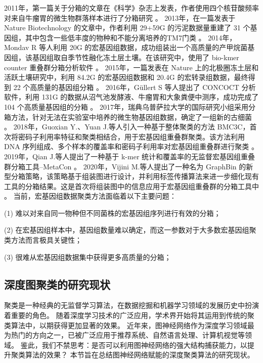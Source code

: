 2011年，第一篇关于分箱的文章在《科学》杂志上发表，作者使用四个核苷酸频率对来自牛瘤胃的微生物群落样本进行了分箱研究 \cite{hess2011metagenomic}。
2013年，在一篇发表于 Nature Biotechnology 的文章中，作者利用 29+59G 的污泥数据量重建了 31 个基因组，其中包含一些低丰度的物种和不能分离培养的TM7门类 \cite{albertsen2013genome}。
2014年，Mondav R 等人利用 20G 的宏基因组数据，成功组装出一个高质量的产甲烷菌基因组，该基因组取自季节性融化冻土层土壤。在该研究中，使用了 bio-kmer counter 重叠群分箱分析软件 \cite{mondav2014discovery}。
2015年，一篇发表在 Nature 上的北极圈冻土层和活跃土壤研究中，利用 84.2G 的宏基因组数据和 20.4G 的宏转录组数据，最终得到 22 个高质量的基因组分箱 \cite{hultman2015multi}。
2016年，Güllert S 等人提出了 CONCOCT 分析软件，利用 131G 的数据从沼气池发酵液、牛瘤胃和大象粪便中测序，成功完成了 104 个高质量基因组的分箱 \cite{gullert2016deep}。
2017年，瑞典乌普萨拉大学的国际研究小组采用分箱方法，针对无法在实验室中培养的微生物基因组数据，确定了一组新的古细菌 \cite{zaremba2017asgard}。
2018年，Guoxian Y.、Yuan J.等人引入一种基于整体聚类的方法 BMC3C，首次将密码子利用率特征和聚类相结合，用于宏基因组重叠群聚类。该方法利用 DNA 序列组成、多个样本的覆盖率和密码子利用率对宏基因组重叠群进行聚类 \cite{yu2018bmc3c}。
2019年，Qian J.等人提出了一种基于 k-mer 统计和覆盖率的无监督宏基因组重叠群分箱工具--MetaCon \cite{qian2019metacon}。
2020年，Vijini M.等人提出了一种名为 GraphBin 的新型分箱策略，该策略基于组装图进行设计，并利用标签传播算法来进一步细化现有工具的分箱结果。这是首次将组装图中的信息应用于宏基因组重叠群的分箱工具中 \cite{mallawaarachchi2020graphbin}。
当前，宏基因组数据聚类方法面临着以下主要问题：

(1) 难以对来自同一物种但不同菌株的宏基因组序列进行有效的分箱；

(2) 在宏基因组样本中，基因组数量难以确定，而这一参数对于大多数宏基因组聚类方法而言极具关键性；

(3) 很难从宏基因组数据集中获得更多高质量的分箱；

\subsection{深度图聚类的研究现状}
聚类是一种经典的无监督学习算法，在数据挖掘和机器学习领域的发展历史中扮演着重要的角色。
随着深度学习技术的广泛应用，学术界开始将其运用到传统的聚类算法中，以期获得更加显著的效果。
近年来，图神经网络作为深度学习领域最为热门的方向之一，已被广泛应用于推荐系统、自然语言处理、计算机视觉等领域。
鉴此，我们不禁思考：是否可以利用图神经网络的强大结构捕获能力，以提升聚类算法的效果？
本节旨在总结图神经网络赋能的深度聚类算法的研究现状。

